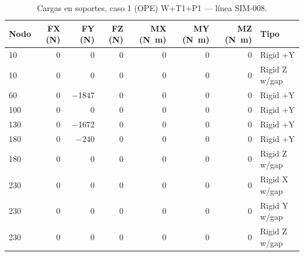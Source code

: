 \begin{table}[htbp]
  \centering
  \footnotesize
  \caption{Cargas en soportes, caso 1 (OPE) W+T1+P1 — línea SIM-008.}
  \label{tab:restricciones-ope}
  \begin{tabular}{lrrrrrrl}
    \toprule
    Nodo & FX (\si{N}) & FY (\si{N}) & FZ (\si{N}) & MX (\si{N.m}) & MY (\si{N.m}) & MZ (\si{N.m}) & Tipo \\
    \midrule
    10 & \num{0} & \num{0} & \num{0} & \num{0} & \num{0} & \num{0} & Rigid +Y \\
    10 & \num{0} & \num{0} & \num{0} & \num{0} & \num{0} & \num{0} & Rigid Z w/gap \\
    60 & \num{0} & \num{-1847} & \num{0} & \num{0} & \num{0} & \num{0} & Rigid +Y \\
    100 & \num{0} & \num{0} & \num{0} & \num{0} & \num{0} & \num{0} & Rigid +Y \\
    130 & \num{0} & \num{-1672} & \num{0} & \num{0} & \num{0} & \num{0} & Rigid +Y \\
    180 & \num{0} & \num{-240} & \num{0} & \num{0} & \num{0} & \num{0} & Rigid +Y \\
    180 & \num{0} & \num{0} & \num{0} & \num{0} & \num{0} & \num{0} & Rigid Z w/gap \\
    230 & \num{0} & \num{0} & \num{0} & \num{0} & \num{0} & \num{0} & Rigid X w/gap \\
    230 & \num{0} & \num{0} & \num{0} & \num{0} & \num{0} & \num{0} & Rigid Y w/gap \\
    230 & \num{0} & \num{0} & \num{0} & \num{0} & \num{0} & \num{0} & Rigid Z w/gap \\
    \bottomrule
  \end{tabular}
\end{table}
